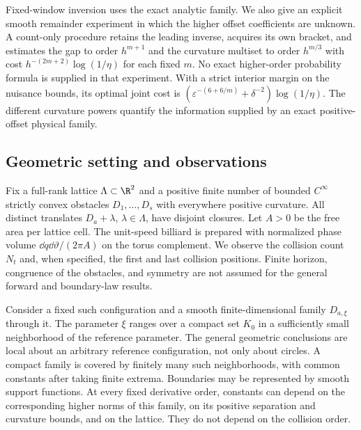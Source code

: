 Fixed-window inversion uses the exact analytic family. We also give an
explicit smooth remainder experiment in which the higher offset
coefficients are unknown. A count-only procedure retains the leading
inverse, acquires its own bracket, and estimates the gap to order
$h^{m+1}$ and the curvature multiset to order $h^{m/3}$ with cost
$h^{-(2m+2)}\log(1/\eta)$ for each fixed $m$. No exact higher-order
probability formula is supplied in that experiment. With a strict
interior margin on the nuisance bounds, its optimal joint cost is
$(\varepsilon^{-(6+6/m)}+\delta^{-2})\log(1/\eta)$.
The different curvature powers quantify the information supplied by
an exact positive-offset physical family.
\subsection{Geometric setting and observations}
Fix a full-rank lattice $\Lambda\subset\R^2$ and a positive finite number of bounded
$C^\infty$ strictly convex obstacles $D_1,\ldots,D_s$ with everywhere
positive curvature. All distinct translates $D_a+\lambda$, $\lambda\in
\Lambda$, have disjoint closures. Let $A>0$ be the free area per lattice
cell. The unit-speed billiard is prepared with normalized phase volume
$\dd q\dd\vartheta/(2\pi A)$ on the torus complement. We observe the
collision count $N_t$ and, when specified, the first and last collision
positions. Finite horizon, congruence of the obstacles, and symmetry
are not assumed for the general forward and boundary-law results.

Consider a fixed such configuration and a smooth finite-dimensional
family $D_{a,\xi}$ through it. The parameter $\xi$ ranges over a compact
set $K_0$ in a sufficiently small neighborhood of the reference parameter.
The general geometric conclusions are local about an arbitrary reference configuration,
not only about circles. A compact family is covered by finitely many
such neighborhoods, with common constants after taking finite extrema.
Boundaries may be represented by smooth support functions. At every
fixed derivative order, constants can depend on the corresponding
higher norms of this family, on its positive separation and curvature
bounds, and on the lattice. They do not depend on the collision order.

